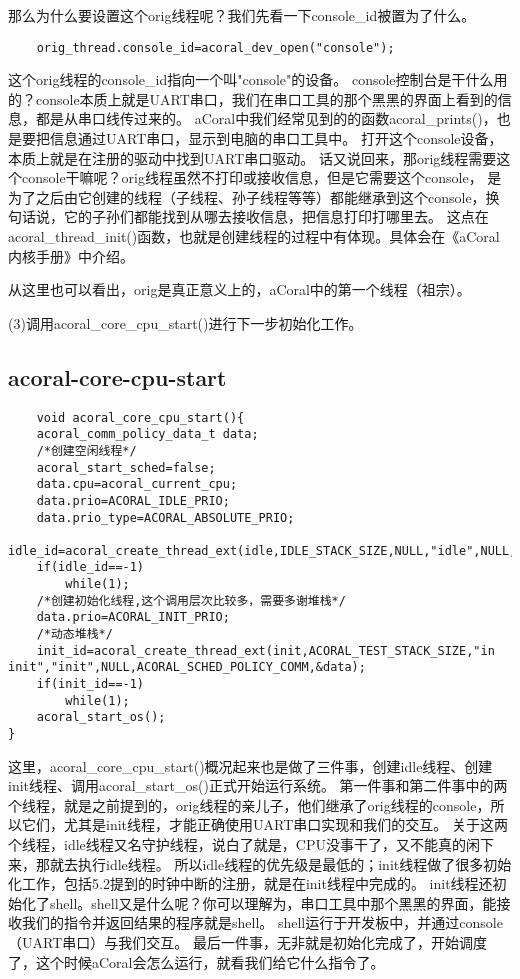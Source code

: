 那么为什么要设置这个orig线程呢？我们先看一下console\_id被置为了什么。
\begin{lstlisting}
	orig_thread.console_id=acoral_dev_open("console");
\end{lstlisting}

这个orig线程的console\_id指向一个叫"console"的设备。
console控制台是干什么用的？console本质上就是UART串口，我们在串口工具的那个黑黑的界面上看到的信息，都是从串口线传过来的。
aCoral中我们经常见到的的函数acoral\_prints()，也是要把信息通过UART串口，显示到电脑的串口工具中。
打开这个console设备，本质上就是在注册的驱动中找到UART串口驱动。
话又说回来，那orig线程需要这个console干嘛呢？orig线程虽然不打印或接收信息，但是它需要这个console，
是为了之后由它创建的线程（子线程、孙子线程等等）都能继承到这个console，换句话说，它的子孙们都能找到从哪去接收信息，把信息打印打哪里去。
这点在acoral\_thread\_init()函数，也就是创建线程的过程中有体现。具体会在《aCoral内核手册》中介绍。

从这里也可以看出，orig是真正意义上的，aCoral中的第一个线程（祖宗）。


(3)调用acoral\_core\_cpu\_start()进行下一步初始化工作。

\subsection{acoral-core-cpu-start}
\begin{lstlisting}
	void acoral_core_cpu_start(){
	acoral_comm_policy_data_t data;
	/*创建空闲线程*/
	acoral_start_sched=false;
	data.cpu=acoral_current_cpu;
	data.prio=ACORAL_IDLE_PRIO;
	data.prio_type=ACORAL_ABSOLUTE_PRIO;
	idle_id=acoral_create_thread_ext(idle,IDLE_STACK_SIZE,NULL,"idle",NULL,ACORAL_SCHED_POLICY_COMM,&data);
	if(idle_id==-1)
		while(1);
	/*创建初始化线程,这个调用层次比较多，需要多谢堆栈*/
	data.prio=ACORAL_INIT_PRIO;
	/*动态堆栈*/
	init_id=acoral_create_thread_ext(init,ACORAL_TEST_STACK_SIZE,"in init","init",NULL,ACORAL_SCHED_POLICY_COMM,&data);
	if(init_id==-1)
		while(1);
	acoral_start_os();
}
\end{lstlisting}

这里，acoral\_core\_cpu\_start()概况起来也是做了三件事，创建idle线程、创建init线程、调用acoral\_start\_os()正式开始运行系统。
第一件事和第二件事中的两个线程，就是之前提到的，orig线程的亲儿子，他们继承了orig线程的console，所以它们，尤其是init线程，才能正确使用UART串口实现和我们的交互。
关于这两个线程，idle线程又名守护线程，说白了就是，CPU没事干了，又不能真的闲下来，那就去执行idle线程。
所以idle线程的优先级是最低的；init线程做了很多初始化工作，包括5.2提到的时钟中断的注册，就是在init线程中完成的。
init线程还初始化了shell。shell又是什么呢？你可以理解为，串口工具中那个黑黑的界面，能接收我们的指令并返回结果的程序就是shell。
shell运行于开发板中，并通过console（UART串口）与我们交互。
最后一件事，无非就是初始化完成了，开始调度了，这个时候aCoral会怎么运行，就看我们给它什么指令了。




